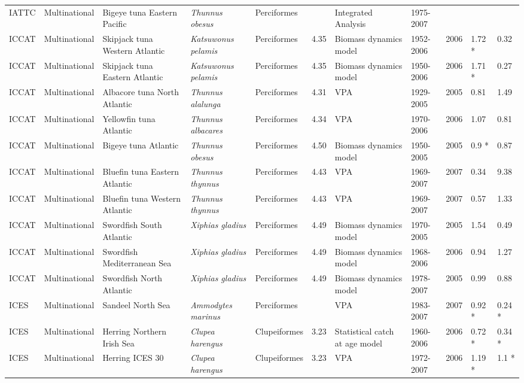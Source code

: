 \begin{longtable}{p{1.5cm}p{1.5cm}p{3cm}p{3cm}p{2.5cm}p{0.9cm}p{1.4cm}p{0.9cm}p{0.9cm}p{0.9cm}p{1cm}}
  IATTC & Multinational & Bigeye tuna Eastern Pacific & \textit{Thunnus obesus} & Perciformes &  & Integrated Analysis & 1975-2007 &  &  &  \\ 
  ICCAT & Multinational & Skipjack tuna Western Atlantic & \textit{Katsuwonus pelamis} & Perciformes & 4.35 & Biomass dynamics model & 1952-2006 & 2006 & 1.72 * & 0.32 \\ 
  ICCAT & Multinational & Skipjack tuna Eastern Atlantic & \textit{Katsuwonus pelamis} & Perciformes & 4.35 & Biomass dynamics model & 1950-2006 & 2006 & 1.71 * & 0.27 \\ 
  ICCAT & Multinational & Albacore tuna North Atlantic & \textit{Thunnus alalunga} & Perciformes & 4.31 & VPA & 1929-2005 & 2005 & 0.81 & 1.49 \\ 
  ICCAT & Multinational & Yellowfin tuna Atlantic & \textit{Thunnus albacares} & Perciformes & 4.34 & VPA & 1970-2006 & 2006 & 1.07 & 0.81 \\ 
  ICCAT & Multinational & Bigeye tuna Atlantic & \textit{Thunnus obesus} & Perciformes & 4.50 & Biomass dynamics model & 1950-2005 & 2005 & 0.9 * & 0.87 \\ 
  ICCAT & Multinational & Bluefin tuna Eastern Atlantic & \textit{Thunnus thynnus} & Perciformes & 4.43 & VPA & 1969-2007 & 2007 & 0.34 & 9.38 \\ 
  ICCAT & Multinational & Bluefin tuna Western Atlantic & \textit{Thunnus thynnus} & Perciformes & 4.43 & VPA & 1969-2007 & 2007 & 0.57 & 1.33 \\ 
  ICCAT & Multinational & Swordfish South Atlantic & \textit{Xiphias gladius} & Perciformes & 4.49 & Biomass dynamics model & 1970-2005 & 2005 & 1.54 & 0.49 \\ 
  ICCAT & Multinational & Swordfish Mediterranean Sea & \textit{Xiphias gladius} & Perciformes & 4.49 & Biomass dynamics model & 1968-2006 & 2006 & 0.94 & 1.27 \\ 
  ICCAT & Multinational & Swordfish North Atlantic & \textit{Xiphias gladius} & Perciformes & 4.49 & Biomass dynamics model & 1978-2007 & 2005 & 0.99 & 0.88 \\ 
  ICES & Multinational & Sandeel North Sea & \textit{Ammodytes marinus} & Perciformes &  & VPA & 1983-2007 & 2007 & 0.92 * & 0.24 * \\ 
  ICES & Multinational & Herring Northern Irish Sea & \textit{Clupea harengus} & Clupeiformes & 3.23 & Statistical catch at age model & 1960-2006 & 2006 & 0.72 * & 0.34 * \\ 
  ICES & Multinational & Herring ICES 30 & \textit{Clupea harengus} & Clupeiformes & 3.23 & VPA & 1972-2007 & 2006 & 1.19 * & 1.1 * \\ 

\end{longtable}
